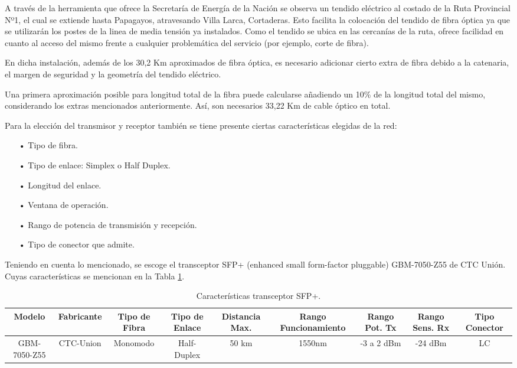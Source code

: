 A través de la herramienta que ofrece la Secretaría de Energía de la Nación se observa un tendido eléctrico al costado de la Ruta Provincial Nº1, el cual se extiende hasta Papagayos, atravesando Villa Larca, Cortaderas. Esto facilita la colocación del tendido de fibra óptica ya que se utilizarán los postes de la linea de media tensión ya instalados.
Como el tendido se ubica en las cercanías de la ruta, ofrece facilidad en cuanto al acceso del mismo frente a cualquier problemática del servicio (por ejemplo, corte de fibra).



En dicha instalación, además de los 30,2 Km aproximados de fibra óptica, es necesario adicionar cierto extra de fibra debido a la catenaria, el margen de seguridad y la geometría del tendido eléctrico.

Una primera aproximación posible para longitud total de la fibra puede calcularse añadiendo un 10\% de la longitud total del mismo, considerando los extras mencionados anteriormente. Así, son necesarios 33,22 Km de cable óptico en total.





Para la elección del transmisor y receptor también se tiene presente ciertas características elegidas de la red:

\begin{enumerate}
\item[•]Tipo de fibra.
\item[•]Tipo de enlace: Simplex o Half Duplex.
\item[•]Longitud del enlace.
\item[•]Ventana de operación.
\item[•]Rango de potencia de transmisión y recepción.
\item[•]Tipo de conector que admite.
\end{enumerate}


Teniendo en cuenta lo mencionado, se escoge el transceptor SFP+ (enhanced small form-factor pluggable) GBM-7050-Z55 de CTC Unión. Cuyas características se mencionan en la Tabla \ref{tab:caracteristicas-SFP+}.


\begin{table}[H]
  \tiny
  \centering
    \begin{tabular}{|c|c|c|c|c|c|c|c|c|}
    \hline
    \rowcolor[rgb]{ .773,  .851,  .945} \textbf{Modelo} & \textbf{Fabricante} & \textbf{Tipo de Fibra} & \textbf{Tipo de Enlace} & \textbf{Distancia Max.} & \textbf{Rango Funcionamiento} & \textbf{Rango Pot. Tx} & \textbf{Rango Sens. Rx} & \textbf{Tipo Conector} \bigstrut\\
    \hline
    GBM-7050-Z55 & CTC-Union & Monomodo & Half-Duplex & 50 km & 1550nm & -3 a 2 dBm & -24 dBm & LC \bigstrut\\
    \hline
    \end{tabular}%
    \caption{Características transceptor SFP+.}
  \label{tab:caracteristicas-SFP+}%
\end{table}%







